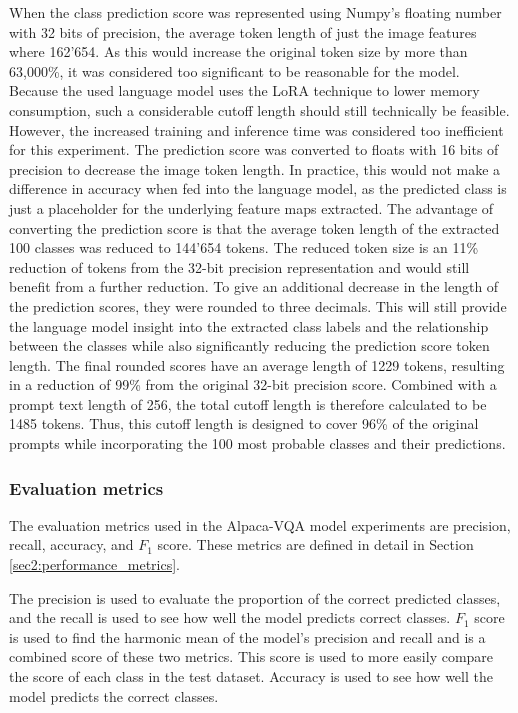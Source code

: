         When the class prediction score was represented using Numpy's floating number with 32 bits of precision, the average token length of just the image features where 162'654. As this would increase the original token size by more than 63,000\%, it was considered too significant to be reasonable for the model. Because the used language model uses the LoRA technique to lower memory consumption, such a considerable cutoff length should still technically be feasible. However, the increased training and inference time was considered too inefficient for this experiment.  
        The prediction score was converted to floats with 16 bits of precision to decrease the image token length. In practice, this would not make a difference in accuracy when fed into the language model, as the predicted class is just a placeholder for the underlying feature maps extracted. 
        The advantage of converting the prediction score is that the average token length of the extracted 100 classes was reduced to 144'654 tokens. The reduced token size is an 11\% reduction of tokens from the 32-bit precision representation and would still benefit from a further reduction. 
        To give an additional decrease in the length of the prediction scores, they were rounded to three decimals. This will still provide the language model insight into the extracted class labels and the relationship between the classes while also significantly reducing the prediction score token length. 
        The final rounded scores have an average length of 1229 tokens, resulting in a reduction of 99\% from the original 32-bit precision score. 
        Combined with a prompt text length of 256, the total cutoff length is therefore calculated to be 1485 tokens. 
        Thus, this cutoff length is designed to cover 96\% of the original prompts while incorporating the 100 most probable classes and their predictions. 

         


        \subsubsection{Evaluation metrics}
        The evaluation metrics used in the Alpaca-VQA model experiments are precision, recall, accuracy, and $F_1$ score. These metrics are defined in detail in Section \ref{sec2:performance_metrics}.
        
        The precision is used to evaluate the proportion of the correct predicted classes, and the recall is used to see how well the model predicts correct classes.
        $F_1$ score is used to find the harmonic mean of the model's precision and recall and is a combined score of these two metrics. This score is used to more easily compare the score of each class in the test dataset. 
        Accuracy is used to see how well the model predicts the correct classes. 
        
